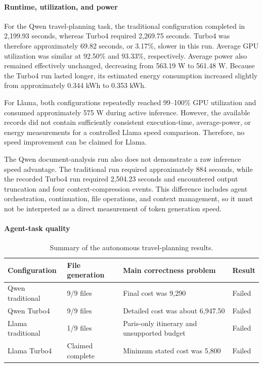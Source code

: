 \documentclass{article}
\begin{document}
\paragraph{Runtime, utilization, and power}

For the Qwen travel-planning task, the traditional configuration completed
in 2,199.93 seconds, whereas Turbo4 required 2,269.75 seconds. Turbo4 was
therefore approximately 69.82 seconds, or 3.17\%, slower in this run.
Average GPU utilization was similar at 92.50\% and 93.33\%, respectively.
Average power also remained effectively unchanged, decreasing from
563.19 W to 561.48 W. Because the Turbo4 run lasted longer, its estimated
energy consumption increased slightly from approximately 0.344 kWh to
0.353 kWh.

For Llama, both configurations repeatedly reached 99--100\% GPU utilization
and consumed approximately 575 W during active inference. However, the
available records did not contain sufficiently consistent execution-time,
average-power, or energy measurements for a controlled Llama speed
comparison. Therefore, no speed improvement can be claimed for Llama.

The Qwen document-analysis run also does not demonstrate a raw inference
speed advantage. The traditional run required approximately 884 seconds,
while the recorded Turbo4 run required 2,504.23 seconds and encountered
output truncation and four context-compression events. This difference
includes agent orchestration, continuation, file operations, and context
management, so it must not be interpreted as a direct measurement of token
generation speed.

\paragraph{Agent-task quality}

\begin{table}[t]
\centering
\small
\caption{Summary of the autonomous travel-planning results.}
\label{tab:combined-agent-quality}
\begin{tabular}{llll}
\toprule
Configuration & File generation & Main correctness problem & Result \\
\midrule
Qwen traditional & 9/9 files & Final cost was \texteuro{}9,290 & Failed \\
Qwen Turbo4 & 9/9 files & Detailed cost was about \texteuro{}6,947.50 & Failed \\
Llama traditional & 1/9 files & Paris-only itinerary and unsupported budget & Failed \\
Llama Turbo4 & Claimed complete & Minimum stated cost was \texteuro{}5,800 & Failed \\
\bottomrule
\end{tabular}
\end{table}
\end{document}
